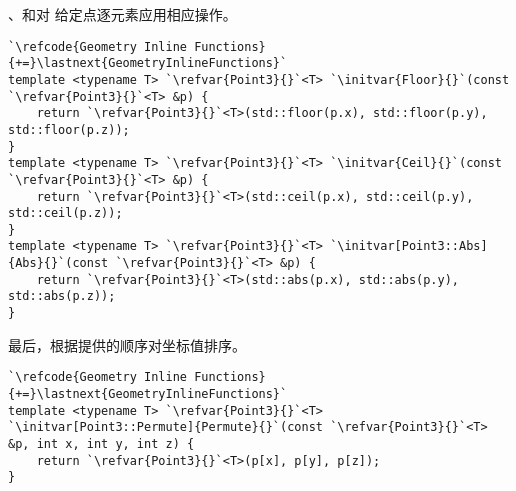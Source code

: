 、和对
给定点逐元素应用相应操作。
\begin{lstlisting}
`\refcode{Geometry Inline Functions}{+=}\lastnext{GeometryInlineFunctions}`
template <typename T> `\refvar{Point3}{}`<T> `\initvar{Floor}{}`(const `\refvar{Point3}{}`<T> &p) {
    return `\refvar{Point3}{}`<T>(std::floor(p.x), std::floor(p.y), std::floor(p.z));
}
template <typename T> `\refvar{Point3}{}`<T> `\initvar{Ceil}{}`(const `\refvar{Point3}{}`<T> &p) {
    return `\refvar{Point3}{}`<T>(std::ceil(p.x), std::ceil(p.y), std::ceil(p.z));
}
template <typename T> `\refvar{Point3}{}`<T> `\initvar[Point3::Abs]{Abs}{}`(const `\refvar{Point3}{}`<T> &p) {
    return `\refvar{Point3}{}`<T>(std::abs(p.x), std::abs(p.y), std::abs(p.z));
}
\end{lstlisting}

最后，根据提供的顺序对坐标值排序。
\begin{lstlisting}
`\refcode{Geometry Inline Functions}{+=}\lastnext{GeometryInlineFunctions}`
template <typename T> `\refvar{Point3}{}`<T>
`\initvar[Point3::Permute]{Permute}{}`(const `\refvar{Point3}{}`<T> &p, int x, int y, int z) {
    return `\refvar{Point3}{}`<T>(p[x], p[y], p[z]);
}
\end{lstlisting}
